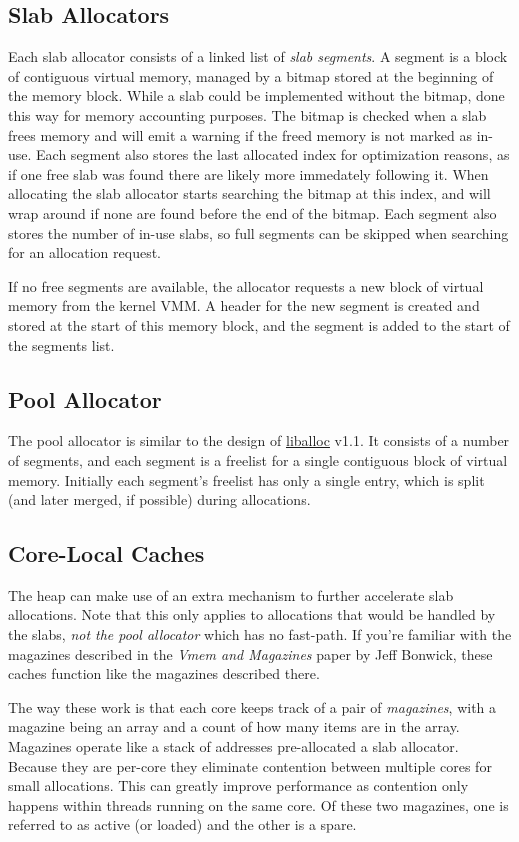 \subsection{Slab Allocators}
Each slab allocator consists of a linked list of \textit{slab segments}. A segment is a block of contiguous virtual memory, managed by a bitmap stored at the beginning of the memory block. While a slab could be implemented without the bitmap, done this way for memory accounting purposes. The bitmap is checked when a slab frees memory and will emit a warning if the freed memory is not marked as in-use. Each segment also stores the last allocated index for optimization reasons, as if one free slab was found there are likely more immedately following it. When allocating the slab allocator starts searching the bitmap at this index, and will wrap around if none are found before the end of the bitmap. Each segment also stores the number of in-use slabs, so full segments can be skipped when searching for an allocation request.

If no free segments are available, the allocator requests a new block of virtual memory from the kernel VMM. A header for the new segment is created and stored at the start of this memory block, and the segment is added to the start of the segments list.

\subsection{Pool Allocator}
The pool allocator is similar to the design of \hyperlink{https://github.com/blanham/liballoc}{liballoc} v1.1. It consists of a number of segments, and each segment is a freelist for a single contiguous block of virtual memory. Initially each segment's freelist has only a single entry, which is split (and later merged, if possible) during allocations.

\subsection{Core-Local Caches}
The heap can make use of an extra mechanism to further accelerate slab allocations. Note that this only applies to allocations that would be handled by the slabs, \textit{not the pool allocator} which has no fast-path. If you're familiar with the magazines described in the \emph{Vmem and Magazines} paper by Jeff Bonwick, these caches function like the magazines described there.

The way these work is that each core keeps track of a pair of \textit{magazines}, with a magazine being an array and a count of how many items are in the array. Magazines operate like a stack of addresses pre-allocated a slab allocator. Because they are per-core they eliminate contention between multiple cores for small allocations. This can greatly improve performance as contention only happens within threads running on the same core. Of these two magazines, one is referred to as active (or loaded) and the other is a spare.

